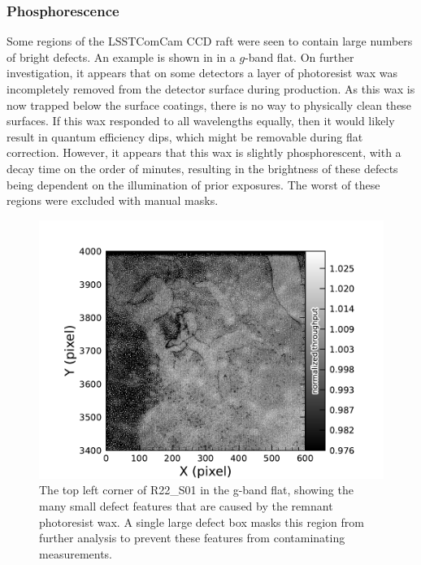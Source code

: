 \subsubsection{Phosphorescence}
Some regions of the LSSTComCam CCD raft were seen to contain large numbers of bright defects.
An example is shown in   in a $g$-band flat. 
On further investigation, it appears that on some detectors a layer of photoresist wax was incompletely removed from the detector surface during production.
As this wax is now trapped below the surface coatings, there is no way to physically clean these surfaces.
If this wax responded to all wavelengths equally, then it would likely result in quantum efficiency dips, which might be removable during flat correction.
However, it appears that this wax is slightly phosphorescent, with a decay time on the order of minutes, resulting in the brightness of these defects being dependent on the illumination of prior exposures.
The worst of these regions were excluded with manual masks.
\begin{figure}[htb!]
  \centering
  \includegraphics[width=0.98\linewidth]{dp1_isr_anomalies-phosphorescence}
  \caption{The top left corner of R22\_S01 in the g-band flat, showing the many small defect features that are caused by the remnant photoresist wax.
  A single large defect box masks this region from further analysis to prevent these features from contaminating measurements.}
  \label{fig:anomalies_phosphorescence}
\end{figure}

